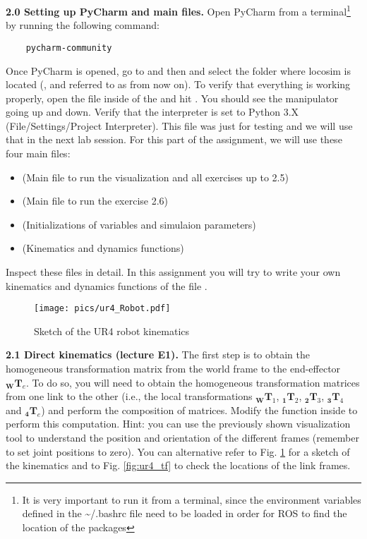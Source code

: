 \documentclass[11pt]{article}
\newcommand{\prepos}[3]{${}_{\mathbf{#2}}{\mathbf{#1}}_{#3}$}
\begin{document}
\textbf{2.0 Setting up PyCharm and main files.} Open PyCharm from a terminal\footnote{It is very important to run it from a terminal, since the environment variables defined in the \textasciitilde/.bashrc file need to be loaded in order for ROS to find the location of the packages} by running the following command:
%
\begin{verbatim}
	pycharm-community
\end{verbatim}
%
Once PyCharm is opened, go to  and then  and select the folder where locosim is located (, and referred to as  from now on). To verify that everything is working properly, open the file   inside of the  and hit . You should see the manipulator going up and down. 
Verify that the interpreter is set to Python 3.X (File/Settings/Project Interpreter).
This file was just for testing and we will use that in  the next lab session.
%
%
For this part of the assignment, we will use these four main files: 
\begin{itemize}
	\item {} (Main file to run the visualization and all exercises up to 2.5)
	\item {} (Main file to run the exercise 2.6)
	\item {} (Initializations of variables and simulaion parameters)
	\item {} (Kinematics and dynamics functions)
\end{itemize}
Inspect these files in detail. In this assignment you will try to write your own kinematics and dynamics functions of the file .\\


\begin{figure}[bht]
	\centering
	\texttt{[image: pics/ur4\_Robot.pdf]}
	\caption{Sketch of the UR4 robot kinematics}
	\label{fig:ur4_robot_kinematics}
\end{figure} 


\textbf{2.1 Direct kinematics (lecture E1).} The first step is to obtain the homogeneous transformation matrix from the world frame to the end-effector \prepos{T}{W}{e}. To do so, you will need to obtain the homogeneous transformation matrices from one link to the other (i.e., the local transformations \prepos{T}{W}{1}, \prepos{T}{1}{2}, \prepos{T}{2}{3}, \prepos{T}{3}{4} and \prepos{T}{4}{e}) and perform the composition of matrices. Modify the function  inside  to perform this computation. Hint: you can use the previously shown visualization tool to understand the  position and orientation of the different frames (remember to set joint positions to zero). 
You can alternative refer to Fig. \ref{fig:ur4_robot_kinematics} for a sketch of the kinematics and to Fig.  \ref{fig:ur4_tf} to check the locations of the  link frames.
\end{document}
